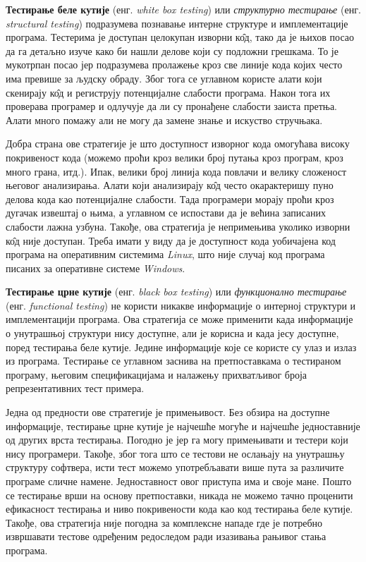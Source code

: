 \documentclass[12pt,oneside]{memoir}
\begin{document}
\begin{description}
\item \textbf{Тестирање беле кутије} (енг. \textit{white box testing}) или \textit{структурно тестирање} (енг. \textit{structural testing}) подразумева познавање интерне структуре и имплементације програма. Тестерима је доступан целокупан изворни к\^{о}д, тако да је њихов посао да га детаљно изуче како би нашли делове који су подложни грешкама. То је мукотрпан посао јер подразумева пролажење кроз све линије кода којих често има превише за људску обраду. Због тога се углавном користе алати који скенирају к\^{о}д и региструју потенцијалне слабости програма. Након тога их проверава програмер и одлучује да ли су пронађене слабости заиста претња. Алати много помажу али не могу да замене знање и искуство стручњака. 
\par Добра страна ове стратегије је што доступност изворног кода омогућава високу покривеност кода (можемо проћи кроз велики број путања кроз програм, кроз много грана, итд.). Ипак, велики број линија кода повлачи и велику сложеност његовог анализирања. Алати који анализирају к\^{о}д често окарактеришу пуно делова кода као потенцијалне слабости. Тада програмери морају проћи кроз дугачак извештај о њима, а углавном се испостави да је већина записаних слабости лажна узбуна. Такође, ова стратегија је непримењива уколико изворни к\^{о}д није доступан. Треба имати у виду да је доступност кода уобичајена код програма на оперативним системима \textit{Linux}, што није случај код програма писаних за оперативне системе \textit{Windows}. 

\item \textbf{Тестирање црне кутије} (енг. \textit{black box testing}) или \textit{функционално тестирање} (енг. \textit{functional testing}) не користи никакве информације о интерној структури и имплементацији програма. Ова стратегија се може применити када информације о унутрашњој структури нису доступне, али је корисна и када јесу доступне, поред тестирања беле кутије. Једине информације које се користе су улаз и излаз из програма. Тестирање се углавном заснива на претпоставкама о тестираном програму, његовим спецификацијама и налажењу прихватљивог броја репрезентативних тест примера.
\par Једна од предности ове стратегије је примењивост. Без обзира на доступне информације, тестирање црне кутије је најчешће могуће и најчешће једноставније од других врста тестирања. Погодно је јер га могу примењивати и тестери који нису програмери. Такође, због тога што се тестови не ослањају на унутрашњу структуру софтвера, исти тест можемо употребљавати више пута за различите програме сличне намене. Једноставност овог приступа има и своје мане. Пошто се тестирање врши на основу претпоставки, никада не можемо тачно проценити ефикасност тестирања и ниво покривености кода као код тестирања беле кутије. Такође, ова стратегија није погодна за комплексне нападе где је потребно извршавати тестове одређеним редоследом ради изазивања рањивог стања програма.


\end{description}
\end{document}
